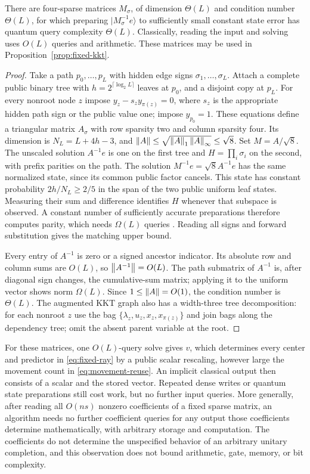 \begin{lemma}\label{lem:tree-hard-ray}
There are four-sparse matrices $M_\sigma$, of dimension $\Theta(L)$ and
condition number $\Theta(L)$, for which preparing
$|M_\sigma^{-1}e\rangle$ to sufficiently small constant state error has
quantum query complexity $\Theta(L)$.  Classically, reading the input and solving
uses $O(L)$ queries and arithmetic.  These matrices may be used in
Proposition~\ref{prop:fixed-kkt}.
\end{lemma}
\begin{proof}
Take a path $p_0,\ldots,p_L$ with hidden edge signs
$\sigma_1,\ldots,\sigma_L$.  Attach a complete public binary tree with
$h=2^{\lceil\log_2L\rceil}$ leaves at $p_0$, and a disjoint copy at
$p_L$.  For every nonroot node $z$ impose
$y_z-s_zy_{\pi(z)}=0$, where $s_z$ is the appropriate hidden path
sign or the public value one; impose $y_{p_0}=1$.
These equations define a triangular matrix $A_\sigma$ with row sparsity
two and column sparsity four.  Its dimension is
$N_L=L+4h-3$, and $\left\lVert A\right\rVert\leq\sqrt{\left\lVert A\right\rVert_1\left\lVert A\right\rVert_\infty}
\leq\sqrt8$.  Set $M=A/\sqrt8$.
The unscaled solution $A^{-1}e$ is one on the first tree and
$H=\prod_i\sigma_i$ on the second, with prefix parities on the path.
The solution $M^{-1}e=\sqrt8 A^{-1}e$ has the same normalized state,
since its common public factor cancels. This state has constant probability
$2h/N_L\geq2/5$ in
the span of the two public uniform leaf states.  Measuring their sum and
difference identifies $H$ whenever that subspace is observed.
A constant number of sufficiently accurate preparations therefore computes
parity, which needs $\Omega(L)$ queries \citep{BealsEtAl2001}.
Reading all signs and forward substitution gives the matching upper bound.

Every entry of $A^{-1}$ is zero or a signed ancestor indicator. Its absolute row
and column sums are $O(L)$, so $\left\lVert A^{-1}\right\rVert=O(L)$.
The path submatrix of $A^{-1}$ is, after diagonal sign changes, the
cumulative-sum matrix; applying it to the uniform vector shows norm
$\Omega(L)$.  Since $1\leq\left\lVert A\right\rVert=O(1)$, the condition number is
$\Theta(L)$.  The augmented KKT graph also has a width-three tree
decomposition: for each nonroot $z$ use the bag
$\{\lambda_z,u_z,x_z,x_{\pi(z)}\}$ and join bags along the dependency
tree; omit the absent parent variable at the root.
\end{proof}

For these matrices, one $O(L)$-query solve gives $v$, which determines
every center and predictor in \eqref{eq:fixed-ray} by a public scalar
rescaling, however large the movement count in \eqref{eq:movement-reuse}.
An implicit classical output then consists of a scalar and the stored
vector.  Repeated dense writes or quantum state preparations still cost
work, but no further input queries.  More generally, after reading all
$O(ns)$ nonzero coefficients of a fixed sparse matrix, an algorithm needs
no further coefficient queries for any output those coefficients determine
mathematically, with arbitrary storage and computation.  The
coefficients do not determine the unspecified behavior of an arbitrary
unitary completion, and this observation does not bound arithmetic, gate,
memory, or bit complexity.

